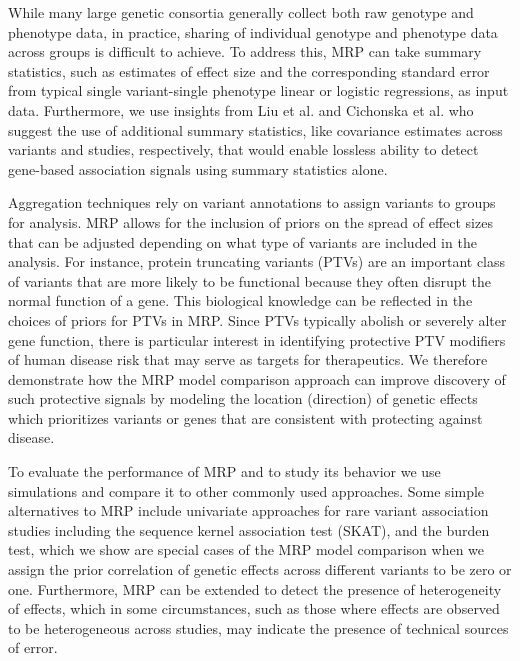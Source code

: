 While many large genetic consortia generally collect both raw genotype and phenotype data, in practice, sharing of individual genotype and phenotype data across groups is difficult to achieve. To address this, MRP can take summary statistics, such as estimates of effect size and the corresponding standard error from typical single variant-single phenotype linear or logistic regressions, as input data. Furthermore, we use insights from Liu et al.\cite{liu2014meta} and Cichonska et al.\cite{cichonska2016metacca} who suggest the use of additional summary statistics, like covariance estimates across variants and studies, respectively, that would enable lossless ability to detect gene-based association signals using summary statistics alone.  

Aggregation techniques rely on variant annotations to assign variants to groups for analysis. MRP allows for the inclusion of priors on the spread of effect sizes that can be adjusted depending on what type of variants are included in the analysis. For instance, protein truncating variants (PTVs)\cite{rivas2013assessing,rivas2015effect} are an important class of variants that are more likely to be functional because they often disrupt the normal function of a gene. This biological knowledge can be reflected in the choices of priors for PTVs in MRP. Since PTVs typically abolish or severely alter gene function, there is particular interest in identifying protective PTV modifiers of human disease risk that may serve as targets for therapeutics\cite{pcsk9,cohen2006sequence,sullivan2012effect}. We therefore demonstrate how the MRP model comparison approach can improve discovery of such protective signals by modeling the location (direction) of genetic effects which prioritizes variants or genes that are consistent with protecting against disease. 

To evaluate the performance of MRP and to study its behavior we use simulations and compare it to other commonly used approaches. Some simple alternatives to MRP include univariate approaches for rare variant association studies including the sequence kernel association test (SKAT)\cite{skat}, and the burden test, which we show are special cases of the MRP model comparison when we assign the prior correlation of genetic effects across different variants to be zero or one. Furthermore, MRP can be extended to detect the presence of heterogeneity of effects, which in some circumstances, such as those where effects are observed to be heterogeneous across studies, may indicate the presence of technical sources of error. 
  
